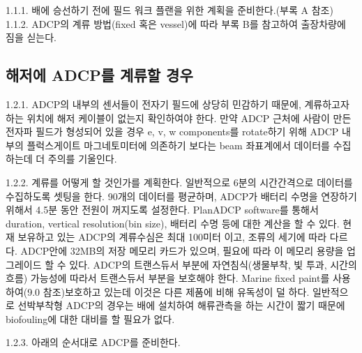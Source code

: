 \documentclass[
]{book}
\begin{document}
1.1.1. 배에 승선하기 전에 필드 워크 플랜을 위한 계획을 준비한다.(부록 A 참조)\\
1.1.2. ADCP의 계류 방법(fixed 혹은 vessel)에 따라 부록 B를 참고하여 출장차량에 짐을 싣는다.

\hypertarget{uxd574uxc800uxc5d0-adcpuxb97c-uxacc4uxb958uxd560-uxacbduxc6b0}{%
\subsection{해저에 ADCP를 계류할 경우}\label{uxd574uxc800uxc5d0-adcpuxb97c-uxacc4uxb958uxd560-uxacbduxc6b0}}

1.2.1. ADCP의 내부의 센서들이 전자기 필드에 상당히 민감하기 때문에, 계류하고자 하는 위치에 해저 케이블이 없는지 확인하여야 한다. 만약 ADCP 근처에 사람이 만든 전자파 필드가 형성되어 있을 경우 e, v, w components를 rotate하기 위해 ADCP 내부의 플럭스게이트 마그네토미터에 의존하기 보다는 beam 좌표계에서 데이터를 수집하는데 더 주의를 기울인다.

1.2.2. 계류를 어떻게 할 것인가를 계획한다. 일반적으로 6분의 시간간격으로 데이터를 수집하도록 셋팅을 한다. 90개의 데이터를 평균하며, ADCP가 배터리 수명을 연장하기 위해서 4.5분 동안 전원이 꺼지도록 설정한다. PlanADCP software를 통해서 duration, vertical resolution(bin size), 배터리 수명 등에 대한 계산을 할 수 있다. 현재 보유하고 있는 ADCP의 계류수심은 최대 100미터 이고, 조류의 세기에 따라 다르다. ADCP안에 32MB의 저장 메모리 카드가 있으며, 필요에 따라 이 메모리 용량을 업그레이드 할 수 있다. ADCP의 트랜스듀서 부분에 자연침식(생물부착, 빛 투과, 시간의 흐름) 가능성에 따라서 트랜스듀서 부분을 보호해야 한다. Marine fixed paint를 사용하여(9.0 참조)보호하고 있는데 이것은 다른 제품에 비해 유독성이 덜 하다. 일반적으로 선박부착형 ADCP의 경우는 배에 설치하여 해류관측을 하는 시간이 짧기 때문에 biofouling에 대한 대비를 할 필요가 없다.

1.2.3. 아래의 순서대로 ADCP를 준비한다.
\end{document}
